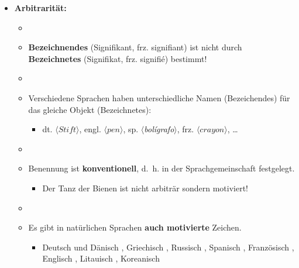 \begin{frame}

\begin{itemize}
	\item<1-> \textbf{Arbitrarität:}

	\begin{itemize}
		\item[]
		\item<1-> \textbf{Bezeichnendes} (Signifikant, frz. signifiant) ist nicht durch \textbf{Bezeichnetes} (Signifikat, frz. signifié) bestimmt!
		\item[]
		\item<2-> Verschiedene Sprachen haben unterschiedliche Namen (Bezeichendes) für das gleiche Objekt (Bezeichnetes):
			
		\begin{itemize}
			\item<3->[$\rightarrow$] dt. $\langle Stift \rangle$, engl. $\langle pen \rangle$, sp. $\langle$\textit{bolígrafo}$\rangle$, frz. $\langle crayon \rangle$, \dots
		\end{itemize}

		\item[]
		\item<4-> Benennung ist \textbf{konventionell}, d.~h. in der Sprachgemeinschaft festgelegt.

		\begin{itemize}
			\item<5->[$\rightarrow$] Der Tanz der Bienen ist nicht arbiträr sondern motiviert!
		\end{itemize}
			
		\item[]
		\item<6-> Es gibt in natürlichen Sprachen \textbf{auch motivierte} Zeichen.
	
		\begin{itemize}
			\item<6->[$\rightarrow$] Deutsch und Dänisch , Griechisch , Russisch , Spanisch , Französisch , Englisch , Litauisch , Koreanisch 
		\end{itemize}
	
	\end{itemize}

\end{itemize}

\end{frame}


